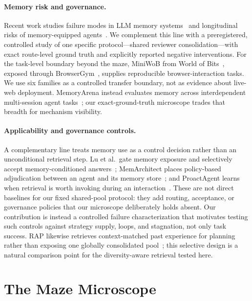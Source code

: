 \documentclass[letterpaper]{article} %
\begin{document}
\paragraph{Memory risk and governance.}
Recent work studies failure modes in LLM memory systems~\citep{garg2026memfail} and
longitudinal risks of memory-equipped agents~\citep{wang2026remembering}. We complement this
line with a preregistered, controlled study of one specific protocol---shared reviewer
consolidation---with exact route-level ground truth and explicitly reported negative
interventions.
For the task-level boundary beyond the maze, MiniWoB from World of
Bits~\citep{shi2017worldofbits}, exposed through
BrowserGym~\citep{chezelles2024browsergym}, supplies reproducible browser-interaction
tasks. We use six families as a controlled transfer boundary, not as evidence
about live-web deployment. MemoryArena instead evaluates memory across interdependent
multi-session agent tasks~\citep{he2026memoryarena}; our exact-ground-truth microscope
trades that breadth for mechanism visibility.

\paragraph{Applicability and governance controls.}
A complementary line treats memory use as a control decision rather than an unconditional
retrieval step. Lu et al.\ gate memory exposure and selectively accept memory-conditioned
answers~\citep{lu2026tag}; MemArchitect places policy-based adjudication between an agent and
its memory store~\citep{kumar2026memarchitect}; and ProactAgent learns when retrieval is
worth invoking during an interaction~\citep{cai2026proactagent}. These are not direct
baselines for our fixed shared-pool protocol: they add routing, acceptance, or governance
policies that our microscope deliberately holds absent. Our contribution is instead a
controlled failure characterization that motivates testing such controls against strategy
supply, loops, and stagnation, not only task success.
RAP likewise retrieves context-matched past experience for planning rather than exposing
one globally consolidated pool~\citep{kagaya2024rap}; this selective design is a natural
comparison point for the diversity-aware retrieval tested here.

\section{The Maze Microscope}\label{sec:method}
\end{document}
